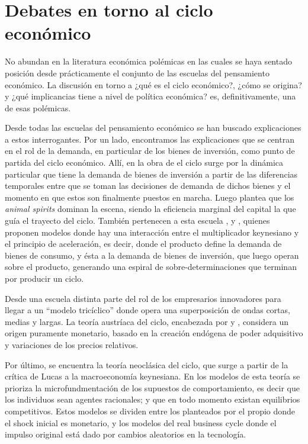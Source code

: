 \documentclass[a4paper]{article}
\begin{document}
\section{Debates en torno al ciclo económico}

No abundan en la literatura económica polémicas en las cuales se haya sentado posición desde prácticamente el conjunto de las escuelas del pensamiento económico. La discusión en torno a ¿qué es el ciclo económico?, ¿cómo se origina?  y ¿qué implicancias tiene a nivel de política económica? es, definitivamente, una de esas polémicas.

Desde todas las escuelas del pensamiento económico se han buscado explicaciones a estos interrogantes. Por un lado, encontramos las explicaciones que se centran en el rol de la demanda, en particular de los bienes de inversión, como punto de partida del ciclo económico. Allí, en la obra de \cite{kalecki2013essays} el ciclo surge por la dinámica particular que tiene la demanda de bienes de inversión a partir de las diferencias temporales entre que se toman las decisiones de demanda de dichos bienes y el momento en que estos son finalmente puestos en marcha. Luego \cite{keynes2018general} plantea que los \textit{animal spirits} dominan la escena, siendo la eficiencia marginal del capital la que guía el trayecto del ciclo. También pertenecen a esta escuela \cite{harrod1936trade}, \cite{kaldor1940model} y \cite{samuelson1939synthesis}, quienes proponen modelos donde hay una interacción entre el multiplicador keynesiano y el principio de aceleración, es decir, donde el producto define la demanda de bienes de consumo, y ésta a la demanda de bienes de inversión, que luego operan sobre el producto, generando una espiral de sobre-determinaciones que terminan por producir un ciclo. 

Desde una escuela distinta \cite{schumpeter1939business} parte del rol de los empresarios innovadores para llegar a un “modelo tricíclico” donde opera una superposición de ondas cortas, medias y largas. 
La teoría austríaca del ciclo, encabezada por \cite{hayek1933} y \cite{von1943elastic}, considera un origen puramente monetario, basado en la creación endógena de poder adquisitivo y variaciones de los precios relativos. 

Por último, se encuentra la teoría neoclásica del ciclo, que surge a partir de la crítica de Lucas a la macroeconomía keynesiana. En los modelos de esta teoría se prioriza la microfundmentación de los supuestos de comportamiento, es decir que los individuos sean agentes racionales; y que en todo momento existan equilibrios competitivos. Estos modelos se dividen entre los planteados por el propio \cite{lucas1975equilibrium} donde el shock inicial es monetario, y los modelos del real business cycle \citep{plosser1989understanding} donde el impulso original está dado por cambios aleatorios en la tecnología.
\end{document}
